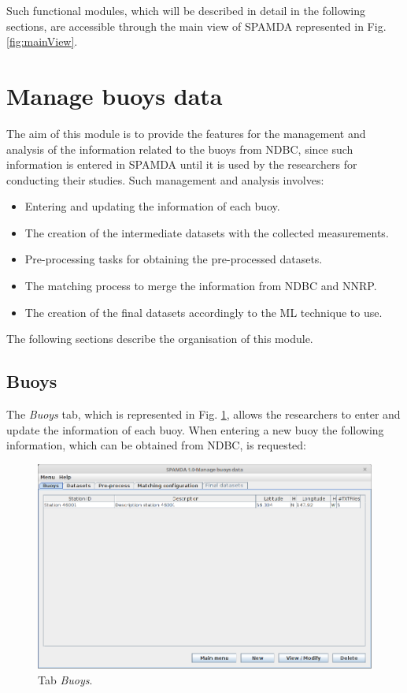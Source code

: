 \begin{onehalfspace}
		Such functional modules, which will be described in detail in the following sections, are accessible through the main view of SPAMDA represented in Fig. \ref{fig:mainView}.

		\section{Manage buoys data}

			The aim of this module is to provide the features for the management and analysis of the information related to the buoys from NDBC, since such information is entered in SPAMDA until it is used by the researchers for conducting their studies. Such management and analysis involves:
				\begin{itemize}
					\item Entering and updating the information of each buoy.
					\item The creation of the intermediate datasets with the collected measurements.
					\item Pre-processing tasks for obtaining the pre-processed datasets.
					\item The matching process to merge the information from NDBC and NNRP.
					\item The creation of the final datasets accordingly to the ML technique to use.
				\end{itemize}
				
			The following sections describe the organisation of this module.
			
			\subsection{Buoys}
			
				The \textit{Buoys} tab, which is represented in Fig. \ref{fig:tabBuoys}, allows the researchers to enter and update the information of each buoy. When entering a new buoy the following information, which can be obtained from NDBC, is requested:
				
				\begin{figure}[ht!]
					\centering
					\includegraphics[scale=0.40]{figures/tabBuoys.png}
					\caption{Tab \textit{Buoys}.}
					\label{fig:tabBuoys}
				\end{figure}
				

\end{onehalfspace}
